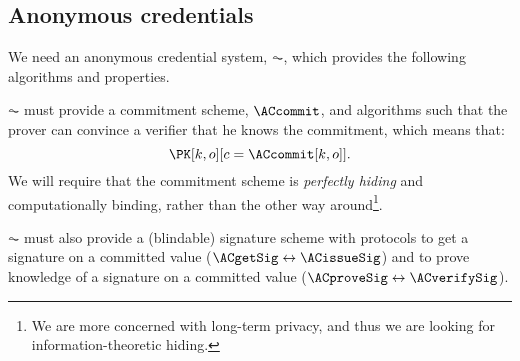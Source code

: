 \subsection{Anonymous credentials}%
\label{ZK-anon-cred}



We need an anonymous credential system, \(\AC\), which provides the following algorithms and properties.


\(\AC\) must provide a commitment scheme, \(\ACcommit\), and algorithms such that the prover can convince a verifier that he knows the commitment, which means that:
\begin{equation*}
  \PK[k, o][c = \ACcommit[k,o]].
\end{equation*}
We will require that the commitment scheme is \emph{perfectly hiding} and computationally binding, rather than the other way around\footnote{We are more concerned with long-term privacy, and thus we are looking for information-theoretic hiding.}.


\(\AC\) must also provide a (blindable) signature scheme with protocols to get a signature on a committed value (\(\ACgetSig\leftrightarrow \ACissueSig\)) and to prove knowledge of a signature on a committed value (\(\ACproveSig\leftrightarrow \ACverifySig\)).

